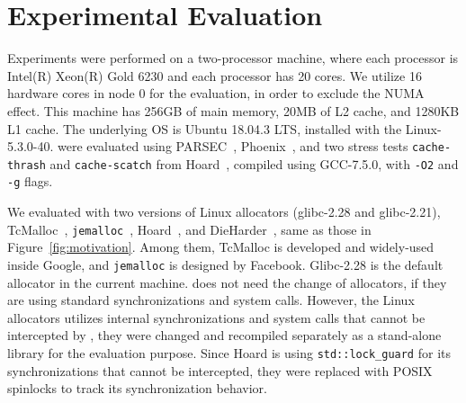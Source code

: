\section{Experimental Evaluation}
\label{sec:evaluation}

Experiments were performed on a two-processor machine, where each processor is Intel(R) Xeon(R) Gold 6230 and each processor has 20 cores. We utilize 16 hardware cores in node 0 for the evaluation, in order to exclude the NUMA effect. This machine has 256GB of main memory, 20MB of L2 cache, and 1280KB L1 cache. 
The underlying OS is Ubuntu 18.04.3 LTS, installed with the Linux-5.3.0-40.   
\MP{} were evaluated using PARSEC~\cite{parsec},  Phoenix~\cite{phoenix}, and two stress tests  \texttt{cache-thrash} and \texttt{cache-scatch} from Hoard~\cite{Hoard}, compiled using GCC-7.5.0, with \texttt{-O2} and \texttt{-g} flags. 

We evaluated \MP{} with two versions of Linux allocators (glibc-2.28 and glibc-2.21), TcMalloc~\cite{tcmalloc}, \texttt{jemalloc}~\cite{jemalloc},  Hoard~\cite{Hoard}, and DieHarder~\cite{DieHarder}, same as those in Figure~\ref{fig:motivation}. Among them, TcMalloc is developed and widely-used inside Google, and \texttt{jemalloc} is designed by Facebook. Glibc-2.28 is the default allocator in the current machine. \MP{} does not need the change of allocators, if they are using standard synchronizations and system calls. However, the Linux allocators utilizes internal synchronizations and system calls that cannot be intercepted by \MP{}, they were changed and recompiled separately as a stand-alone library for the evaluation purpose. Since Hoard is using \texttt{std::lock\_guard} for its synchronizations that cannot be intercepted, they were replaced with POSIX spinlocks to track its synchronization behavior.



